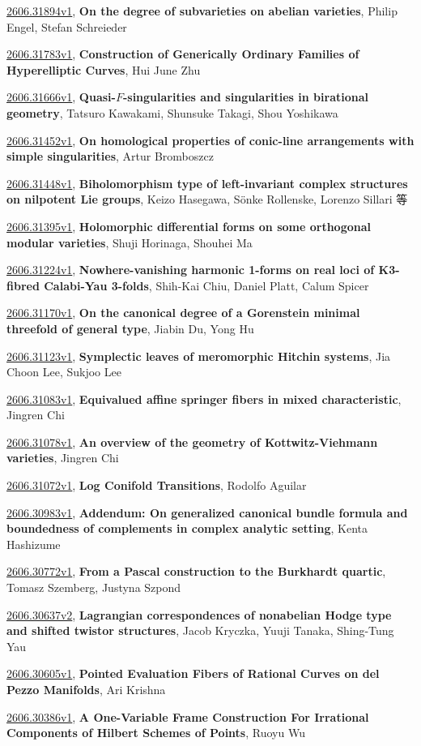 \documentclass[9pt, a4paper]{article}
\theoremstyle{plain}
\theoremstyle{definition}
\theoremstyle{remark}
\newcommand{\arxiv}[3]{\href{https://arxiv.org/abs/#1}{#1}, \textbf{\textcolor{arxivblue}{#2}}, #3}
\begin{document}
\arxiv{2606.31894v1}{On the degree of subvarieties on abelian varieties}{Philip Engel, Stefan Schreieder}

\arxiv{2606.31783v1}{Construction of Generically Ordinary Families of Hyperelliptic Curves}{Hui June Zhu}

\arxiv{2606.31666v1}{Quasi-$F$-singularities and singularities in birational geometry}{Tatsuro Kawakami, Shunsuke Takagi, Shou Yoshikawa}

\arxiv{2606.31452v1}{On homological properties of conic-line arrangements with simple singularities}{Artur Bromboszcz}

\arxiv{2606.31448v1}{Biholomorphism type of left-invariant complex structures on nilpotent Lie groups}{Keizo Hasegawa, Sönke Rollenske, Lorenzo Sillari 等}

\arxiv{2606.31395v1}{Holomorphic differential forms on some orthogonal modular varieties}{Shuji Horinaga, Shouhei Ma}

\arxiv{2606.31224v1}{Nowhere-vanishing harmonic 1-forms on real loci of K3-fibred Calabi-Yau 3-folds}{Shih-Kai Chiu, Daniel Platt, Calum Spicer}

\arxiv{2606.31170v1}{On the canonical degree of a Gorenstein minimal threefold of general type}{Jiabin Du, Yong Hu}

\arxiv{2606.31123v1}{Symplectic leaves of meromorphic Hitchin systems}{Jia Choon Lee, Sukjoo Lee}

\arxiv{2606.31083v1}{Equivalued affine springer fibers in mixed characteristic}{Jingren Chi}

\arxiv{2606.31078v1}{An overview of the geometry of Kottwitz-Viehmann varieties}{Jingren Chi}

\arxiv{2606.31072v1}{Log Conifold Transitions}{Rodolfo Aguilar}

\arxiv{2606.30983v1}{Addendum: On generalized canonical bundle formula and boundedness of complements in complex analytic setting}{Kenta Hashizume}

\arxiv{2606.30772v1}{From a Pascal construction to the Burkhardt quartic}{Tomasz Szemberg, Justyna Szpond}

\arxiv{2606.30637v2}{Lagrangian correspondences of nonabelian Hodge type and shifted twistor structures}{Jacob Kryczka, Yuuji Tanaka, Shing-Tung Yau}

\arxiv{2606.30605v1}{Pointed Evaluation Fibers of Rational Curves on del Pezzo Manifolds}{Ari Krishna}

\arxiv{2606.30386v1}{A One-Variable Frame Construction For Irrational Components of Hilbert Schemes of Points}{Ruoyu Wu}
\end{document}
